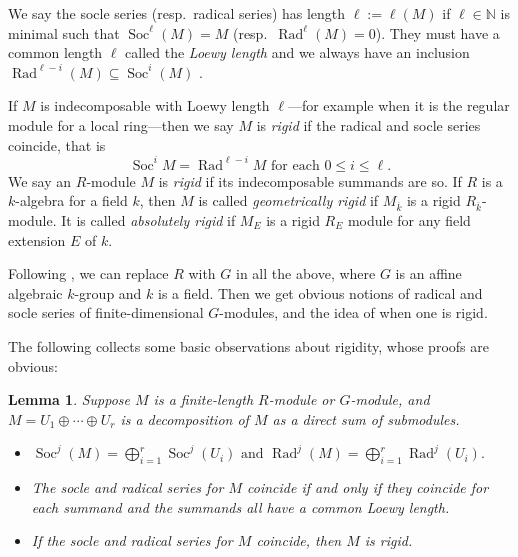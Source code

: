 \documentclass[11pt,reqno]{amsart}
\newtheorem{lemma}{Lemma}[subsection]
\theoremstyle{definition}
\theoremstyle{remark}
\theoremstyle{definition}
\theoremstyle{plain}
\DeclareMathOperator{\Rad}{Rad}
\DeclareMathOperator{\Soc}{Soc}
\newcommand{\bark}{{\overline{k}}}
\begin{document}
We say the socle series (resp.~radical series) has length $\ell:=\ell(M)$ if $\ell\in\mathbb N$ is minimal such that $\Soc^\ell(M)=M$ (resp.~$\Rad^\ell(M)=0$). 
They must have a common length $\ell$ called the \emph{Loewy length} and we always have an inclusion $\Rad^{\ell-i}(M) \subseteq \Soc^i(M)$ \cite[\S9.4]{ANT}.
 
If $M$ is indecomposable with Loewy length $\ell$---for example when it is the regular module for a local ring---then we say $M$ is \emph{rigid} if the radical and socle series coincide, that is $$
\Soc^iM = \Rad^{\ell-i}M \textrm{ for each } 0\leq i \leq \ell.$$ We say an $R$-module $M$ is \emph{rigid} if its indecomposable summands are so. 
If $R$ is a $k$-algebra for a field $k$, then $M$ is called \emph{geometrically rigid} if $M_{\bark}$ is a rigid $R_{\bark}$-module. It is called \emph{absolutely rigid} if $M_{E}$ is a rigid $R_E$ module for any field extension $E$ of $k$.


Following \cite[I.2.14, II.D.1]{Jan03}, we can replace $R$ with $G$ in all the above, where $G$ is an affine algebraic $k$-group and $k$ is a field. Then we get obvious notions of radical and socle series of finite-dimensional $G$-modules, and the idea of when one is rigid. 


The following collects some basic observations about rigidity, whose proofs are obvious:

\begin{lemma}\label{sumrigid}
Suppose $M$ is a finite-length $R$-module or $G$-module, and $M = U_1\oplus \cdots \oplus U_r$ is a decomposition of $M$ as a direct sum of submodules.
\begin{itemize}
\item[(i)] $\Soc^j(M) = \bigoplus_{i=1}^r \Soc^j(U_i) \textrm{  and } \Rad^j(M) = \bigoplus_{i=1}^r \Rad^j(U_i).$
\item[(ii)] The socle and radical series for $M$ coincide if and only if they coincide for each summand \emph{and} the summands all have a common Loewy length.
\item[(iii)] If the socle and radical series for $M$ coincide, then $M$ is rigid.
\end{itemize}
\end{lemma}
\end{document}
